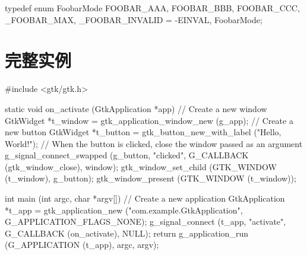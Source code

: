 \begin{ccode}
typedef enum FoobarMode {
    FOOBAR_AAA,
    FOOBAR_BBB,
    FOOBAR_CCC,
    _FOOBAR_MAX,
    _FOOBAR_INVALID = -EINVAL,
} FoobarMode;
\end{ccode}

\section{完整实例}

\begin{ccode}
#include <gtk/gtk.h>

static void on_activate (GtkApplication *app) {
    // Create a new window
    GtkWidget *t_window = gtk_application_window_new (g_app);
    // Create a new button
    GtkWidget *t_button = gtk_button_new_with_label ("Hello, World!");
    // When the button is clicked, close the window passed as an argument
    g_signal_connect_swapped (g_button, "clicked", G_CALLBACK (gtk_window_close), window);
    gtk_window_set_child (GTK_WINDOW (t_window), g_button);
    gtk_window_present (GTK_WINDOW (t_window));
}

int main (int argc, char *argv[]) {
    // Create a new application
    GtkApplication *t_app = gtk_application_new ("com.example.GtkApplication", G_APPLICATION_FLAGS_NONE);
    g_signal_connect (t_app, "activate", G_CALLBACK (on_activate), NULL);
    return g_application_run (G_APPLICATION (t_app), argc, argv);
}
\end{ccode}